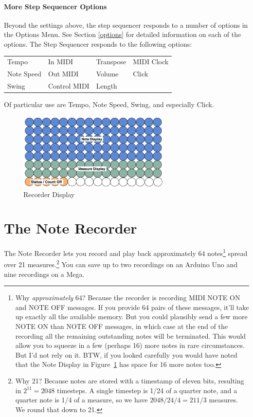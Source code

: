 \documentclass{article}
\begin{document}
\paragraph{More Step Sequencer Options}

Beyond the settings above, the step sequencer responds to a number of options in the Options Menu.  See Section \ref{options} for detailed information on each of the options.  The Step Sequencer responds to the following options:

\vspace{1em}
\begin{tabular}{llll}
Tempo& 			In MIDI&		Transpose&	MIDI Clock\\
Note Speed& 		Out MIDI& 	Volume	&	Click\\
Swing& 			Control MIDI&	Length	&\\
\end{tabular}

\vspace{1em}
Of particular use are Tempo, Note Speed, Swing, and especially Click.


\begin{figure}
\vspace{-4em}\includegraphics[width=3in]{recorder.pdf}
\vspace{-2em}\caption{\small Recorder Display}\vspace{-1em}
\label{recorder}
\end{figure}

\section {The Note Recorder}

The Note Recorder lets you record and play back approximately 64 notes\footnote{Why {\it approximately} 64? Because the recorder is recording MIDI NOTE ON and NOTE OFF messages.  If you provide 64 pairs of these messages, it'll take up exactly all the available memory.  But you could plausibly send a few more NOTE ON than NOTE OFF messages, in which case at the end of the recording all the remaining outstanding notes will be terminated.  This would allow you to squeeze in a few (perhaps 16) more notes in rare circumstances.  But I'd not rely on it.  BTW, if you looked carefully you would have noted that the Note Display in Figure~\ref{recorder} has space for 16 more notes too.} spread over 21 measures.\footnote{Why 21?  Because notes are stored with a timestamp of eleven bits, resulting in \(2^11 = 2048\) timesteps.  A single timestep is 1/24 of a quarter note, and a quarter note is 1/4 of a measure, so we have \(2048 / 24 / 4 = 21 1/3\) measures.  We round that down to 21.}  You can save up to two recordings on an Arduino Uno and nine recordings on a Mega.
\end{document}
